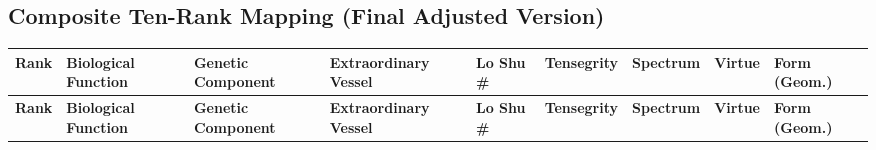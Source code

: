 \documentclass{article}
\begin{document}
\begin{landscape}

\section*{Composite Ten-Rank Mapping (Final Adjusted Version)}

\renewcommand{\arraystretch}{1.3}

\begin{longtable}{|p{0.8cm}|p{3.2cm}|p{3.2cm}|p{3.2cm}|p{1.8cm}|p{2.4cm}|p{2.4cm}|p{1.8cm}|p{3cm}|}
\hline
\textbf{Rank} & 
\textbf{Biological Function} & 
\textbf{Genetic Component} & 
\textbf{Extraordinary Vessel} & 
\textbf{Lo Shu \#} & 
\textbf{Tensegrity} & 
\textbf{Spectrum} & 
\textbf{Virtue} & 
\textbf{Form (Geom.)} \\
\hline
\endfirsthead

\hline
\textbf{Rank} & 
\textbf{Biological Function} & 
\textbf{Genetic Component} & 
\textbf{Extraordinary Vessel} & 
\textbf{Lo Shu \#} & 
\textbf{Tensegrity} & 
\textbf{Spectrum} & 
\textbf{Virtue} & 
\textbf{Form (Geom.)} \\
\hline
\endhead


\end{longtable}
\end{landscape}
\end{document}
